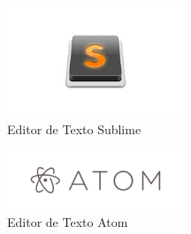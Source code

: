 \begin{itemize}
\begin{figure}[h]
  \centering
  \includegraphics[width=200px, scale=0.5]{figuras/sublime}
  \caption{Editor de Texto Sublime}
  \label{table:sublime}
\end{figure}
\begin{figure}[h]
  \centering
  \includegraphics[width=200px, scale=0.5]{figuras/atom}
  \caption{Editor de Texto Atom}
  \label{table:atom}
\end{figure}
\end{itemize}
